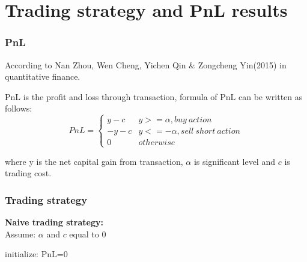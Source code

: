 \documentclass[xcolor={x11names,svgnames,dvipsnames}]{beamer}
\begin{document}
\section{Trading strategy and PnL results}

\begin{frame}
\frametitle{PnL}
According to Nan Zhou, Wen Cheng, Yichen Qin & Zongcheng Yin(2015) in quantitative finance.

PnL is the profit and loss through transaction, formula of PnL can be written as follows:\\
\begin{equation*}       
PnL=\left\{          
  \begin{array}{ll}   
    y-c  & y>=\alpha, buy\ action   \\  
     -y-c & y<=-\alpha, sell\ short\ action \\
     0 & otherwise
  \end{array}
\right.       
\end{equation*}

where y is the net capital gain from transaction, $\alpha$ is significant level and $c$ is trading cost.
\end{frame}



\begin{frame}
\frametitle{Trading strategy}
		\textbf{Naive trading strategy:}\\
Assume: $\alpha$ and $c$ equal to 0
		\begin{algorithm}[H]
				         		    \dontprintsemicolon
				         		    \linesnumbered
				         		    \nl initialize: PnL=0\\				         		    
				         		    \nl {}				         		    				         		    
				         		    
			\end{algorithm} \\

\end{frame}
\end{document}

